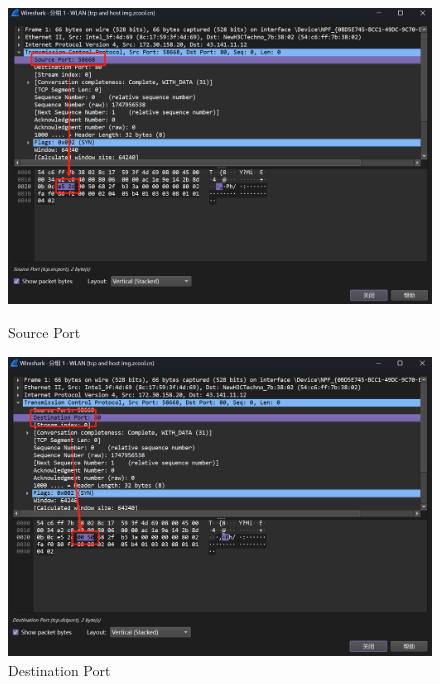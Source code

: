 \documentclass{article}
\begin{document}
	\begin{figure}[H]
		\centering
		\begin{minipage}[b]{0.45\textwidth}
			\includegraphics[width=\textwidth]{images/5.Source Port.png}
			\caption{Source Port}
		\end{minipage}
		\hfill
		\begin{minipage}[b]{0.45\textwidth}
			\includegraphics[width=\textwidth]{images/6.Destination Port.png}
			\caption{Destination Port}
		\end{minipage}
	\end{figure}
	
\end{document}
